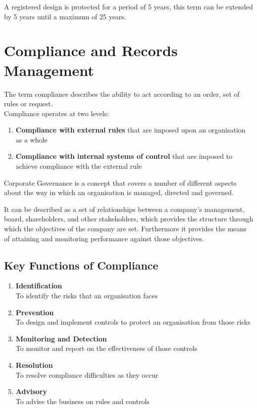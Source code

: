 \documentclass[11pt]{article}
\theoremstyle{definition}
\begin{document}
A registered design is protected for a period of 5 years, this term can be extended by 5 years until a maximum of 25 years.

\section{Compliance and Records Management}
\begin{definition}
	The term compliance describes the ability to act according to an order, set of rules or request.\\
	Compliance operates at two levels:
	\begin{enumerate}
		\item \textbf{Compliance with external rules} that are imposed upon an organisation as a whole
		\item \textbf{Compliance with internal systems of control} that are imposed to achieve compliance with the external rule
	\end{enumerate}
\end{definition}
Corporate Governance is a concept that covers a number of different aspects about the way in which an organisation is managed, directed and governed.

It can be described as a set of relationships between a company’s management, board, shareholders, and other stakeholders, which provides the structure through which the objectives of the company are set. Furthermore it provides the means of attaining and monitoring performance against those objectives.
\subsection{Key Functions of Compliance}
\begin{enumerate}
	\item \textbf{Identification}\\
	To identify the risks that an organisation faces
	\item \textbf{Prevention}\\
	To design and implement controls to protect an organisation from those risks
	\item \textbf{Monitoring and Detection}\\
	To monitor and report on the effectiveness of those controls
	\item \textbf{Resolution}\\
	To resolve compliance difficulties as they occur
	\item \textbf{Advisory}\\
	To advise the business on rules and controls
\end{enumerate}
\end{document}
